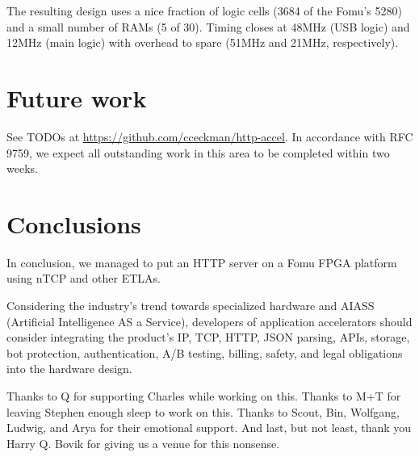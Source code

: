 \documentclass[sigconf,authorversion,nonacm]{acmart}
\begin{document}

The resulting design uses a nice fraction of logic cells (3684 of the Fomu's 5280) and a small number of RAMs (5 of 30). Timing closes at 48MHz (USB logic) and 12MHz (main logic) with overhead to spare (51MHz and 21MHz, respectively).



\section{Future work}

See TODOs at \url{https://github.com/cceckman/http-accel}. In accordance with RFC 9759\cite{rfc9759}, we expect all outstanding work in this area to be completed within two weeks.

\section{Conclusions}


In conclusion, we managed to put an HTTP server on a Fomu FPGA platform using nTCP and other ETLAs.

Considering the industry's trend towards specialized hardware and AIASS (Artificial Intelligence AS a Service), developers of application accelerators should consider integrating the product's IP, TCP, HTTP, JSON parsing, APIs, storage, bot protection, authentication, A/B testing, billing, safety, and legal obligations into the hardware design.

\begin{acks}
Thanks to Q for supporting Charles while working on this.
Thanks to M+T for leaving Stephen enough sleep to work on this.
Thanks to Scout, Bin, Wolfgang, Ludwig, and Arya for their emotional support.
And last, but not least, thank you Harry Q. Bovik for giving us a venue for this nonsense.
\end{acks}



\end{document}
